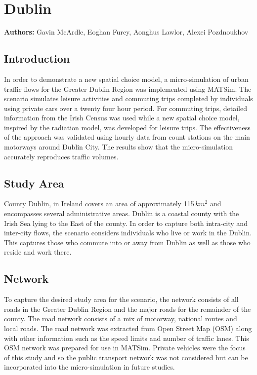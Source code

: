 \section{Dublin}
\label{sec:dublin}
\hfill \textbf{Authors:} Gavin McArdle, Eoghan Furey, Aonghus Lawlor, Alexei Pozdnoukhov

\subsection{Introduction}
In order to demonstrate a new spatial choice model, a micro-simulation of urban traffic flows for the Greater Dublin Region was implemented using MATSim. The scenario simulates leisure activities and commuting trips completed by individuals using private cars over a twenty four hour period. For commuting trips, detailed information from the Irish Census was used while a new spatial choice model, inspired by the radiation model, was developed for leisure trips. The effectiveness of the approach was validated using hourly data from count stations on the main motorways around Dublin City. The results show that the micro-simulation accurately reproduces traffic volumes.

\subsection{Study Area}
County Dublin, in Ireland covers an area of approximately 115\,$km^2$ and encompasses several administrative areas. Dublin is a coastal county with the Irish Sea lying to the East of the county. In order to capture both intra-city and inter-city flows, the scenario considers individuals who live or work in the Dublin. This captures those who commute into or away from Dublin as well as those who reside and work there.

\subsection{Network}
To capture the desired study area for the scenario, the network consists of all roads in the Greater Dublin Region and the major roads for the remainder of the county.  The road network consists of a mix of motorway, national routes and local roads. The road network was extracted from Open Street Map (OSM) along with other information such as the speed limits and number of traffic lanes. This OSM network was prepared for use in MATSim. Private vehicles were the focus of this study and so the public transport network was not considered but can be incorporated into the micro-simulation in future studies.

